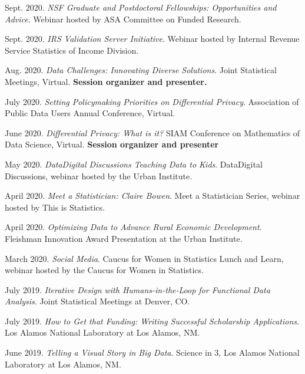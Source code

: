 \documentclass[11pt, letterpaper, roman]{moderncv} %
\begin{document}
\begin{etaremune}[topsep=0pt, itemsep=0.75pt, partopsep=0pt, parsep=0pt]
    \item Sept. 2020. \textit{NSF Graduate and Postdoctoral Fellowships: Opportunities and Advice}. Webinar hosted by ASA Committee on Funded Research.
    
    \item Sept. 2020. \textit{IRS Validation Server Initiative}. Webinar hosted by Internal Revenue Service Statistics of Income Division.
    
    \item Aug. 2020. \textit{Data Challenges: Innovating Diverse Solutions}. Joint Statistical Meetings, Virtual. \textbf{Session organizer and presenter.}
    
    \item July 2020. \textit{Setting Policymaking Priorities on Differential Privacy}. Association of Public Data Users Annual Conference, Virtual.
    
    \item June 2020. \textit{Differential Privacy: What is it?} SIAM Conference on Mathematics of Data Science, Virtual. \textbf{Session organizer and presenter}
    
    \item May 2020. \textit{Data\@Urban Digital Discussions Teaching Data to Kids}. Data\@Urban Digital Discussions, webinar hosted by the Urban Institute.
    
    \item April 2020. \textit{Meet a Statistician: Claire Bowen}. Meet a Statistician Series, webinar hosted by This is Statistics.
    
    \item April 2020. \textit{Optimizing Data to Advance Rural Economic Development}. Fleishman Innovation Award Presentation at the Urban Institute.
    
    \item March 2020. \textit{Social Media}. Caucus for Women in Statistics Lunch and Learn, webinar hosted by the Caucus for Women in Statistics.
    
    \item July 2019. \textit{Iterative Design with Humans-in-the-Loop for Functional Data Analysis}. Joint Statistical Meetings at Denver, CO. 
    
    \item July 2019. \textit{How to Get that Funding: Writing Successful Scholarship Applications}. Los Alamos National Laboratory at Los Alamos, NM.
    
    \item June 2019. \textit{Telling a Visual Story in Big Data}. Science in 3, Los Alamos National Laboratory at Los Alamos, NM. 
    

\end{etaremune}
\end{document}
